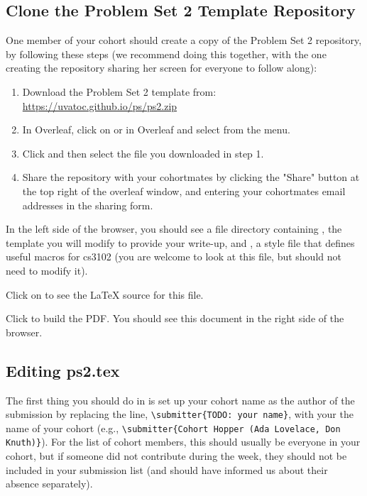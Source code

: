 \documentclass[11pt]{article}
\begin{document}
{\subsection{Clone the Problem Set 2 Template Repository}

One member of your cohort should create a copy of the Problem Set 2 repository, by following these steps (we recommend doing this together, with the one creating the repository sharing her screen for everyone to follow along):

\begin{enumerate}
\item Download the Problem Set 2 template from: \url{https://uvatoc.github.io/ps/ps2.zip}
\item In Overleaf, click on  or  in Overleaf and select  from the menu.
\item Click  and then select the  file you downloaded in step 1.
\item Share the repository with your cohortmates by clicking the "Share" button at the top right of the overleaf window, and entering your cohortmates email addresses in the sharing form.
\end{enumerate}

In the left side of the browser, you should see a file directory containing , the template you will modify to provide your write-up, and , a style file that defines useful macros for cs3102 (you are welcome to look at this file, but should not need to modify it).

Click on  to see the LaTeX source for this file.

Click  to build the PDF. You should see this document in the right side of the browser.

\subsection{Editing ps2.tex}

The first thing you should do in  is set up your cohort name as the author of the submission by replacing the line, \texttt{\textbackslash submitter\{TODO: your name\}}, with your the name of your cohort (e.g., \texttt{\textbackslash submitter\{Cohort Hopper (Ada Lovelace, Don Knuth)\}}). For the list of cohort members, this should usually be everyone in your cohort, but if someone did not contribute during the week, they should not be included in your submission list (and should have informed us about their absence separately).

}
\end{document}

